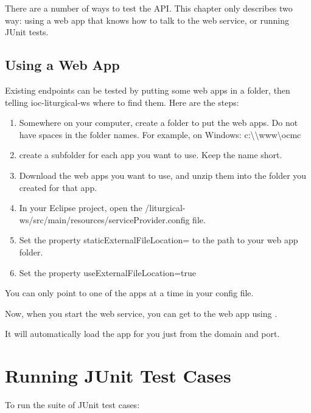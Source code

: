 \documentclass[]{memoir}
\def\iocWs{ioc-liturgical-ws }%
\begin{document}
There are a number of ways to test the API. This chapter only describes two way: using a web app that knows how to talk to the web service, or running JUnit tests.

\subsection{Using a Web App}

Existing endpoints can be tested by putting some web apps in a folder, then telling \iocWs where to find them.  Here are the steps:

\begin{enumerate}
    \item{Somewhere on your computer, create a folder to put the web apps.  Do not have spaces in the folder names.  For example, on Windows: c:\textbackslash\textbackslash www\textbackslash ocmc}
    \item{create a subfolder for each app you want to use.  Keep the name short.}
    \item{Download the web apps you want to use, and unzip them into the folder you created for that app.  }
    \item{In your Eclipse project, open the /liturgical-ws/src/main/resources/serviceProvider.config file.}
    \item{Set the property staticExternalFileLocation= to the path to your web app folder.}
    \item{Set the property useExternalFileLocation=true}
\end{enumerate}

You can only point to one of the apps at a time in your config file.

Now, when you start the web service, you can get to the web app using .

It will automatically load the app for you just from the domain and port.

\section{Running JUnit Test Cases}

To run the suite of JUnit test cases:
\end{document}
